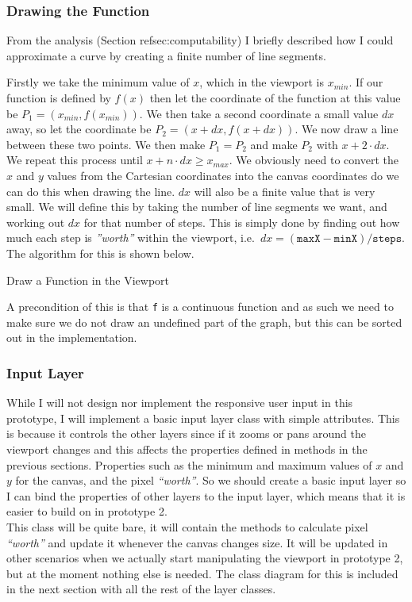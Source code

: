 \documentclass[../../../../../../main.tex]{subfiles}
\begin{document}
\subsubsection{Drawing the Function}
From the analysis (Section ref{sec:computability}) I briefly described how I could approximate a curve by creating a finite number of line segments.

Firstly we take the minimum value of $x$, which in the viewport is $x_{min}$. If our function is defined by $f(x)$ then let the coordinate of the function at this value be $P_1 = (x_{min},f(x_{min}))$. We then take a second coordinate a small value $dx$ away, so let the coordinate be $P_2 = (x+dx,f(x+dx))$. We now draw a line between these two points. We then make $P_1 = P_2$ and make $P_2$ with $x+2\cdot dx$. We repeat this process until $x+n\cdot dx \geq x_{max}$. We obviously need to convert the $x$ and $y$ values from the Cartesian coordinates into the canvas coordinates do we can do this when drawing the line. $dx$ will also be a finite value that is very small. We will define this by taking the number of line segments we want, and working out $dx$ for that number of steps. This is simply done by finding out how much each step is \textit{''worth''} within the viewport, i.e.\ $dx = (\texttt{maxX} - \texttt{minX})/\texttt{steps}$. The algorithm for this is shown below.

\begin{algorithm}
\DontPrintSemicolon
\caption{Draw a Function in the Viewport}
\end{algorithm}

A precondition of this is that \texttt{f} is a continuous function and as such we need to make sure we do not draw an undefined part of the graph, but this can be sorted out in the implementation.
\subsubsection{Input Layer}
While I will not design nor implement the responsive user input in this prototype, I will implement a basic input layer class with simple attributes.  This is because it controls the other layers since if it zooms or pans around the viewport changes and this affects the properties defined in methods in the previous sections. Properties such as the minimum and maximum values of $x$ and $y$ for the canvas, and the pixel \textit{``worth''}. So we should create a basic input layer so I can bind the properties of other layers to the input layer, which means that it is easier to build on in prototype 2.\\
This class will be quite bare, it will contain the methods to calculate pixel \textit{``worth''} and update it whenever the canvas changes size. It will be updated in other scenarios when we actually start manipulating the viewport in prototype 2, but at the moment nothing else is needed. The class diagram for this is included in the next section with all the rest of the layer classes.
\end{document}
